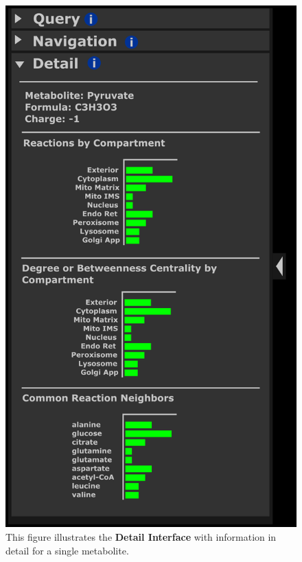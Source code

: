 \begin{figure}[htbp]
\includegraphics[scale=1]{sketch_2017-01-02_5}
\centering
\caption{This figure illustrates the \textbf{Detail Interface} with information in detail for a single metabolite.}
\label{fig:2017-01-02_5}
\end{figure}

